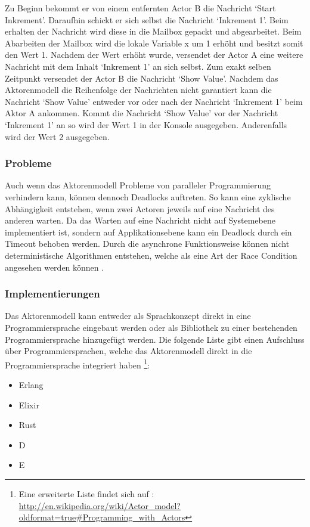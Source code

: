 Zu Beginn bekommt er von einem entfernten Actor B die Nachricht `Start Inkrement'. Daraufhin schickt er sich selbst die Nachricht `Inkrement 1'. Beim erhalten der Nachricht wird diese in die Mailbox gepackt und abgearbeitet. Beim Abarbeiten der Mailbox wird die lokale Variable x um 1 erhöht und besitzt somit den Wert 1. Nachdem der Wert erhöht wurde, versendet der Actor A eine weitere Nachricht mit dem Inhalt `Inkrement 1' an sich selbst. Zum exakt selben Zeitpunkt versendet der Actor B die Nachricht `Show Value'. Nachdem das Aktorenmodell  die Reihenfolge der Nachrichten nicht garantiert kann die Nachricht `Show Value' entweder vor oder nach der Nachricht `Inkrement 1' beim Aktor A ankommen. Kommt die Nachricht `Show Value' vor der Nachricht `Inkrement 1' an so wird der Wert 1 in der Konsole ausgegeben. Anderenfalls wird der Wert 2 ausgegeben.

\subsubsection{Probleme}
Auch wenn das Aktorenmodell Probleme von paralleler Programmierung verhindern kann, können dennoch Deadlocks auftreten. So kann eine zyklische Abhängigkeit entstehen, wenn zwei Actoren jeweils auf eine Nachricht des anderen warten. Da das Warten auf eine Nachricht nicht auf Systemebene implementiert ist, sondern auf Applikationsebene kann ein Deadlock durch ein Timeout behoben werden. Durch die asynchrone Funktionsweise können nicht deterministische Algorithmen entstehen, welche als eine Art der Race Condition angesehen werden können \cite[p. 86]{Erb2012}. 

\subsubsection{Implementierungen}
Das Aktorenmodell kann entweder als Sprachkonzept direkt in eine Programmiersprache eingebaut werden oder als Bibliothek zu einer bestehenden Programmiersprache hinzugefügt werden. Die folgende Liste gibt einen Aufschluss über Programmiersprachen, welche das Aktorenmodell direkt in die Programmiersprache integriert haben \footnote{Eine erweiterte Liste findet sich auf  \cite[p. 86]{Erb2012}: \url{http://en.wikipedia.org/wiki/Actor_model?oldformat=true#Programming_with_Actors}}:

\begin{itemize}
  \item Erlang
  \item Elixir
  \item Rust
  \item D
  \item E
\end{itemize}

